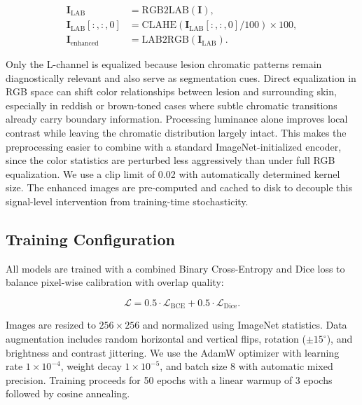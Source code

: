 \documentclass[conference]{IEEEtran}
\begin{document}
\begin{equation}
\begin{aligned}
\mathbf{I}_{\text{LAB}} &= \text{RGB2LAB}(\mathbf{I}), \\
\mathbf{I}_{\text{LAB}}[:,:,0] &= \text{CLAHE}(\mathbf{I}_{\text{LAB}}[:,:,0] / 100) \times 100, \\
\mathbf{I}_{\text{enhanced}} &= \text{LAB2RGB}(\mathbf{I}_{\text{LAB}}).
\end{aligned}
\end{equation}

Only the L-channel is equalized because lesion chromatic patterns remain diagnostically relevant and also serve as segmentation cues. Direct equalization in RGB space can shift color relationships between lesion and surrounding skin, especially in reddish or brown-toned cases where subtle chromatic transitions already carry boundary information. Processing luminance alone improves local contrast while leaving the chromatic distribution largely intact. This makes the preprocessing easier to combine with a standard ImageNet-initialized encoder, since the color statistics are perturbed less aggressively than under full RGB equalization. We use a clip limit of 0.02 with automatically determined kernel size. The enhanced images are pre-computed and cached to disk to decouple this signal-level intervention from training-time stochasticity.

\subsection{Training Configuration}

All models are trained with a combined Binary Cross-Entropy and Dice loss to balance pixel-wise calibration with overlap quality:

\begin{equation}
\mathcal{L} = 0.5 \cdot \mathcal{L}_{\text{BCE}} + 0.5 \cdot \mathcal{L}_{\text{Dice}}.
\end{equation}

Images are resized to $256\times256$ and normalized using ImageNet statistics. Data augmentation includes random horizontal and vertical flips, rotation ($\pm 15^\circ$), and brightness and contrast jittering. We use the AdamW optimizer with learning rate $1\times10^{-4}$, weight decay $1\times10^{-5}$, and batch size 8 with automatic mixed precision. Training proceeds for 50 epochs with a linear warmup of 3 epochs followed by cosine annealing.
\end{document}
